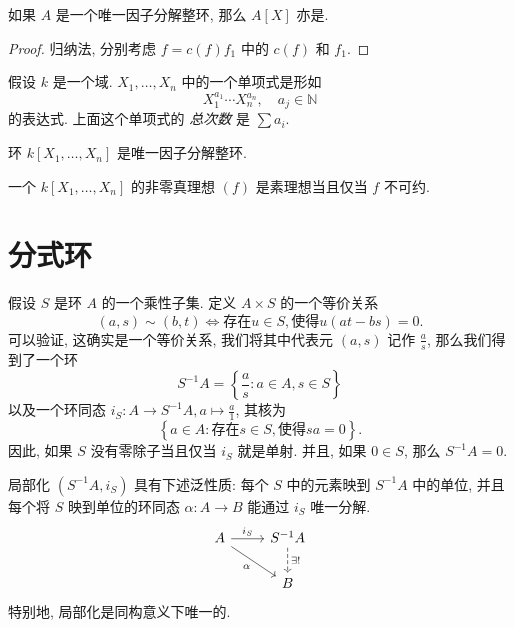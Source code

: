 \begin{theorem}
  如果 \( A \) 是一个唯一因子分解整环, 那么 \( A[X] \) 亦是.
\end{theorem}
\begin{proof}
  归纳法, 分别考虑 \( f = c(f) f_1 \) 中的 \( c(f) \) 和 \( f_1 \).
\end{proof}

假设 \( k \) 是一个域. \( X_1, \ldots, X_n \) 中的一个单项式是形如
\[
  X_1^{a_1} \cdots X_n^{a_n},\quad a_j \in \mathbb{N}
\]
的表达式. 上面这个单项式的 \emph{总次数} 是 \( \sum a_i \).

\begin{theorem}
  环 \( k[X_1, \ldots, X_n] \) 是唯一因子分解整环.
\end{theorem}

\begin{corollary}
  一个 \( k[X_1, \ldots, X_n] \) 的非零真理想 \( (f) \) 是素理想当且仅当 \( f \)
  不可约.
\end{corollary}

\section{分式环}

假设 \( S \) 是环 \( A \) 的一个乘性子集. 定义 \( A \times S \) 的一个等价关系
\[
  (a, s) \sim (b, t) \iff \text{存在} u \in S, \text{使得} u(at - bs) = 0.
\]
可以验证, 这确实是一个等价关系, 我们将其中代表元 \( (a, s) \) 记作 \(
\frac{a}{s} \), 那么我们得到了一个环
\[
  S^{-1}A = \left\lbrace \frac{a}{s}: a \in A, s \in S \right\rbrace
\]
以及一个环同态 \( i_S: A \to S^{-1} A, a \mapsto \frac{a}{1} \), 其核为
\[
  \left\lbrace a \in A: \text{存在} s \in S, \text{使得} sa = 0 \right\rbrace.
\]
因此, 如果 \( S \) 没有零除子当且仅当 \( i_S \) 就是单射. 并且, 如果 \( 0 \in S
\), 那么 \( S^{-1} A = 0 \).

\begin{proposition}
  局部化 \( (S^{-1}A, i_S) \) 具有下述泛性质: 每个 \( S \) 中的元素映到 \(
  S^{-1} A \) 中的单位, 并且每个将 \( S \) 映到单位的环同态 \( \alpha: A \to B
  \) 能通过 \( i_S \) 唯一分解.
\[\begin{tikzcd}
	A & {S^{-1}A} \\
	& B
	\arrow["{i_S}", from=1-1, to=1-2]
	\arrow["\alpha"', from=1-1, to=2-2]
	\arrow["{\exists !}", dashed, from=1-2, to=2-2]
\end{tikzcd}\]
特别地, 局部化是同构意义下唯一的.
\end{proposition}
